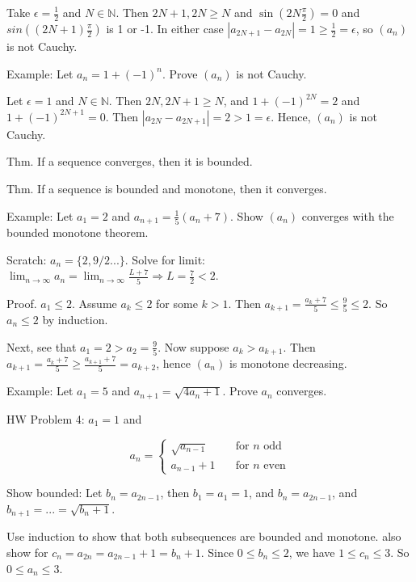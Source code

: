 \documentclass{report}
\begin{document}
Take $\epsilon = \frac{1}{2}$ and $N \in \mathbb{N}$. Then $2N+1, 2N \geq N$ and $\sin\left(2N \frac{\pi}{2}\right) = 0$ and $sin\left((2N +1)\frac{\pi}{2}\right)$ is 1 or -1. In either case $\left|a_{2N+1} - a_{2N}\right| = 1 \geq \frac{1}{2} = \epsilon$, so $(a_n)$ is not Cauchy. 

Example: Let $a_n = 1 + (-1)^n$. Prove $(a_n)$ is not Cauchy. 

Let $\epsilon = 1$ and $N \in \mathbb{N}$. Then $2N, 2N +1 \geq N$, and $1 + (-1)^{2N} = 2$ and $1 + (-1)^{2N + 1} = 0$. Then $\left|a_{2N} - a_{2N +1}\right| = 2 > 1 = \epsilon$. Hence, $(a_n)$ is not Cauchy. 

Thm. If a sequence converges, then it is bounded. 

Thm. If a sequence is bounded and monotone, then it converges. 

Example: Let $a_1 = 2$ and $a_{n+1} = \frac{1}{5}(a_n + 7)$. Show $(a_n)$ converges with the bounded monotone theorem. 

Scratch: $a_n = \{2, 9/2 ...\}$. Solve for limit: $\lim_{n \rightarrow \infty} a_n = \lim_{n \rightarrow \infty} \frac{L + 7}{5} \Rightarrow L = \frac{7}{2} < 2$. 

Proof. $a_1 \leq 2$. Assume $a_k \leq 2$ for some $k >1$. Then $a_{k+1} = \frac{a_k + 7}{5} \leq \frac{9}{5} \leq 2$. So $a_n \leq 2$ by induction. 

Next, see that $a_1 = 2 > a_2 = \frac{9}{5}$. Now suppose $a_k > a_{k+ 1}$. Then $a_{k+1} = \frac{a_k + 7}{5} \geq \frac{a_{k+1} + 7}{5} = a_{k + 2}$, hence $(a_n)$ is monotone decreasing. 

Example: Let $a_1 = 5$ and $a_{n+1} = \sqrt{4a_n + 1}$. Prove $a_n$ converges. 

HW Problem 4: $a_1 = 1$ and 

\begin{equation*}
        a_n = \left\{
                \begin{array}{ll}
                        \sqrt{a_{n-1}} &\quad  \text{for $n$ odd} \\
                        a_{n - 1} + 1 & \quad \text{for $n$ even}
                \end{array}\right.
\end{equation*}

Show bounded: Let $b_n = a_{2n - 1}$, then $b_1 = a_1 = 1$, and $b_n = a_{2n -1}$, and $b_{n+1} = ...  = \sqrt{b_n + 1}$. 

Use induction to show that both subsequences are bounded and monotone. also show for $c_n = a_{2n} = a_{2n-1} + 1 = b_n + 1$. Since $0 \leq b_n \leq 2$, we have $1 \leq c_n \leq 3$. So $0 \leq a_n \leq 3$. 
\end{document}
